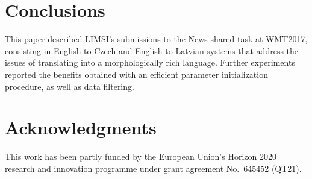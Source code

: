 \documentclass[11pt,letterpaper,final]{article}
\begin{document}
\FloatBarrier
\section{Conclusions}

This paper described LIMSI's submissions to the News shared task
at WMT2017, consisting in English-to-Czech and English-to-Latvian
systems that address the issues of translating into a morphologically
rich language. Further experiments reported the benefits obtained
with an efficient parameter initialization procedure, as well
as data filtering.


\section*{Acknowledgments}

This work has been partly funded by the European Union’s
Horizon 2020 research and innovation programme under grant
agreement No.~645452 (QT21).



\end{document}
